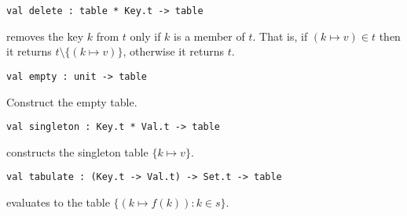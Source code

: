 \begin{cluster}
\label{grp:grm:aug-ordtable-interface::delete}

\begin{gram}[delete]
\label{grm:aug-ordtable-interface::delete}
\begin{verbatim}
val delete : table * Key.t -> table
\end{verbatim}
 removes the key $k$ from $t$ only if $k$ is a member of $t$.
That is, if $(k \mapsto v) \in t$ then it returns
$t \setminus \{(k \mapsto v)\}$, otherwise it returns $t$.

\end{gram}
\end{cluster}

\begin{cluster}
\label{grp:grm:aug-ordtable-interface::empty}

\begin{gram}[empty]
\label{grm:aug-ordtable-interface::empty}
\begin{verbatim}
val empty : unit -> table
\end{verbatim}
Construct the empty table.

\end{gram}
\end{cluster}

\begin{cluster}
\label{grp:gr:aug-ordtable-interface:singleton}

\begin{gram}[singleton]
\label{gr:aug-ordtable-interface:singleton}
\begin{verbatim}
val singleton : Key.t * Val.t -> table
\end{verbatim}
 constructs the singleton table $\{k \mapsto v\}$.

\end{gram}
\end{cluster}

\begin{cluster}
\label{grp:grm:aug-ordtable-interface::tabulate}

\begin{gram}[tabulate]
\label{grm:aug-ordtable-interface::tabulate}
\begin{verbatim}
val tabulate : (Key.t -> Val.t) -> Set.t -> table
\end{verbatim}
 evaluates to the table $\{(k \mapsto f(k)) : k \in s\}$.

\end{gram}
\end{cluster}

